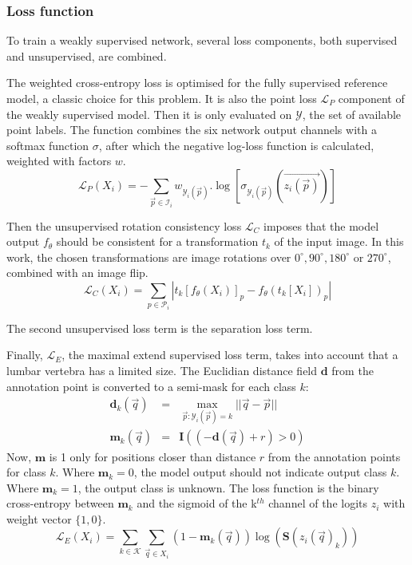 \begin{multicols}{2}
\subsubsection*{Loss function}
\par{
    To train a weakly supervised network, several loss components, both supervised and unsupervised, are combined.
}
\par{
    The weighted cross-entropy loss is optimised for the fully supervised reference model, a classic choice for this problem.
    It is also the point loss $\mathcal{L}_P$ component of the weakly supervised model. Then it is only evaluated on $\mathcal{Y}$, the set of available point labels.
    The function combines the six network output channels with a softmax function $\sigma$, after which the negative log-loss function is calculated, weighted with factors $w$.
}
\begin{equation} \label{eq:crossEntropy}
    \mathcal{L}_P(X_i) = -\sum_{\vec{p} \in \mathcal{I}_i} w_{\mathcal{Y}_i(\vec{p})}.\log\left[\sigma_{\mathcal{Y}_i(\vec{p})}\left(\vec{z_i(\vec{p})}\right)\right]
\end{equation}
\par{
    Then the unsupervised rotation consistency loss $\mathcal{L}_C$  imposes that the model output $f_\theta$ should be consistent for a transformation $t_k$ of the input image.
    In this work, the chosen transformations are image rotations over $0^\circ, 90^\circ, 180^\circ$ or $270^\circ$, combined with an image flip.
}
\begin{equation}
    \mathcal{L}_C(X_i) = \sum_{p \in \mathcal{P}_i} \left| t_k\left[f_\theta(X_i)\right]_p - f_\theta\left( t_k[X_i] \right)_p  \right|  
\end{equation}
\par{
    The second unsupervised loss term is the separation loss term.  
}
\par{
    Finally, $\mathcal{L}_E$, the maximal extend supervised loss term, takes into account that a lumbar vertebra has a limited size.
    The Euclidian distance field $\mathbf{d}$ from the annotation point is converted to a semi-mask for each class $k$:
    \begin{eqnarray}
        \mathbf{d}_k(\vec{q}) &=& \max_{\vec{p}:\mathcal{Y}_i(\vec{p})=k}||\vec{q} - \vec{p}||\\
        \mathbf{m}_k(\vec{q}) &=& \mathbf{I}\left( (-\mathbf{d}(\vec{q}) + r) > 0 \right)
    \end{eqnarray}
    Now, $\mathbf{m}$ is 1 only for positions closer than distance $r$ from the annotation points for class $k$.
    Where $\mathbf{m}_k=0$, the model output should not indicate output class $k$. Where $\mathbf{m}_k=1$, the output class is unknown.
    The loss function is the binary cross-entropy between $\mathbf{m}_k$ and the sigmoid of the k$^{th}$ channel of the logits $z_i$ with weight vector $\{1, 0\}$.
}
\begin{equation}
    \mathcal{L}_E(X_i) = \sum_{k\in\mathcal{K}}\sum_{\vec{q}\in X_i}  (1-\mathbf{m}_k(\vec{q})) \log(\mathbf{S}(z_i(\vec{q})_k)) 
\end{equation}


\end{multicols}
